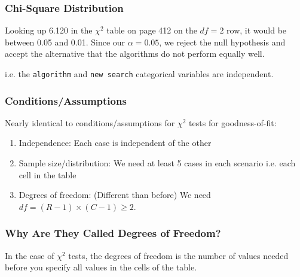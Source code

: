 \documentclass[handout]{beamer}
\newcommand{\blue}[1]{\textcolor{blue2}{#1}}
\begin{document}
\begin{frame}
\frametitle{Chi-Square Distribution}
Looking up 6.120 in the $\chi^2$ table on page 412 on the $df=2$ row, it would be between 0.05 and 0.01.  Since our $\alpha=0.05$, we reject the null hypothesis and accept the alternative that the algorithms do not perform equally well.  

\vspace{0.5cm}

i.e. the {\tt algorithm} and {\tt new search} categorical variables are independent.



\end{frame}


\begin{frame}
\frametitle{Conditions/Assumptions}
Nearly identical to conditions/assumptions for $\chi^2$ tests for goodness-of-fit:
\begin{enumerate}
\pause\item \blue{Independence}:  Each case is independent of the other
\pause\item \blue{Sample size/distribution}:  We need at least 5 cases in each scenario i.e. each cell in the table
\pause\item \blue{Degrees of freedom}: (Different than before)  We need $df=(R-1)\times(C-1) \geq 2$.
\end{enumerate}

\end{frame}


\begin{frame}
\frametitle{Why Are They Called Degrees of Freedom?}

In the case of $\chi^2$ tests, the degrees of freedom is the number of values needed before you specify \blue{all} values in the cells of the table.

\end{frame}
\end{document}
